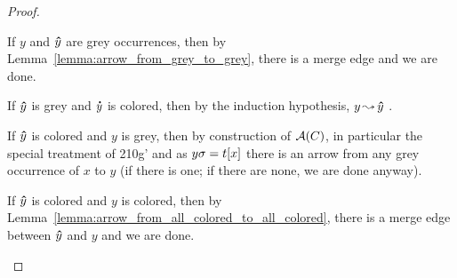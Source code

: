 \documentclass[,%
	paper=a4,%
	DIV11, %
	twoside=false,%
	liststotoc,
	bibtotoc,
	draft=false,%
	numbers=noendperiod
]{scrartcl}
\begin{document}
\begin{proof}
\begin{description}
			If $y$ and $\bm\hat y$ are grey occurrences, then by Lemma~\ref{lemma:arrow_from_grey_to_grey}, there is a merge edge and we are done.

			If $\bm\hat y$ is grey and $\bm\dot y$ is colored, then by the induction hypothesis, $y \operatorname{\leadsto} \bm\hat y$ . 

			If $\bm\hat y$ is colored and $y$ is grey,
			then by construction of $\operatorname{\mathcal{A}}(C)$, in particular the special treatment of 210g' and as $y\sigma = t[x]$ there is an arrow from any grey occurrence of $x$ to $y$ (if there is one; if there are none, we are done anyway).



			If $\bm\hat y$ is colored and $y$ is colored, then by Lemma~\ref{lemma:arrow_from_all_colored_to_all_colored}, there is a merge edge between $\bm\hat y$ and $y$ and we are done.
			\qedhere
	\end{description}
\end{proof}
\end{document}
